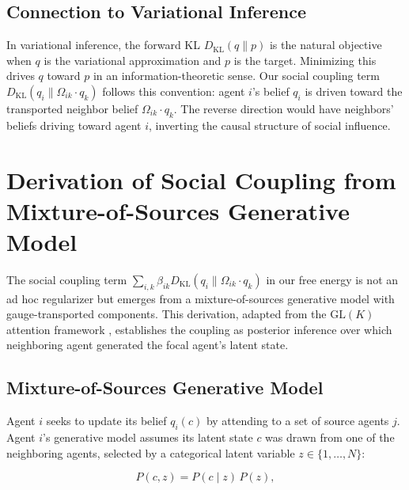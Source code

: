 \documentclass[12pt]{article}
\begin{document}
\subsection{Connection to Variational Inference}

In variational inference, the forward KL $D_{\mathrm{KL}}(q \| p)$ is the natural objective when $q$ is the variational approximation and $p$ is the target. Minimizing this drives $q$ toward $p$ in an information-theoretic sense. Our social coupling term $D_{\mathrm{KL}}(q_i \| \Omega_{ik}\cdot q_k)$ follows this convention: agent $i$'s belief $q_i$ is driven toward the transported neighbor belief $\Omega_{ik}\cdot q_k$. The reverse direction would have neighbors' beliefs driving toward agent $i$, inverting the causal structure of social influence.


\section{Derivation of Social Coupling from Mixture-of-Sources Generative Model}
\label{app:social_coupling}

The social coupling term $\sum_{i,k} \beta_{ik} D_{\mathrm{KL}}(q_i \| \Omega_{ik}\cdot q_k)$ in our free energy is not an ad hoc regularizer but emerges from a mixture-of-sources generative model with gauge-transported components. This derivation, adapted from the $\mathrm{GL}(K)$ attention framework \citep{Dennis2025}, establishes the coupling as posterior inference over which neighboring agent generated the focal agent's latent state.

\subsection{Mixture-of-Sources Generative Model}

Agent $i$ seeks to update its belief $q_i(c)$ by attending to a set of source agents $j$. Agent $i$'s generative model assumes its latent state $c$ was drawn from one of the neighboring agents, selected by a categorical latent variable $z \in \{1, \ldots, N\}$:

\begin{equation}
P(c, z) = P(c \mid z)\, P(z),
\label{eq:mixture_joint}
\end{equation}
\end{document}
